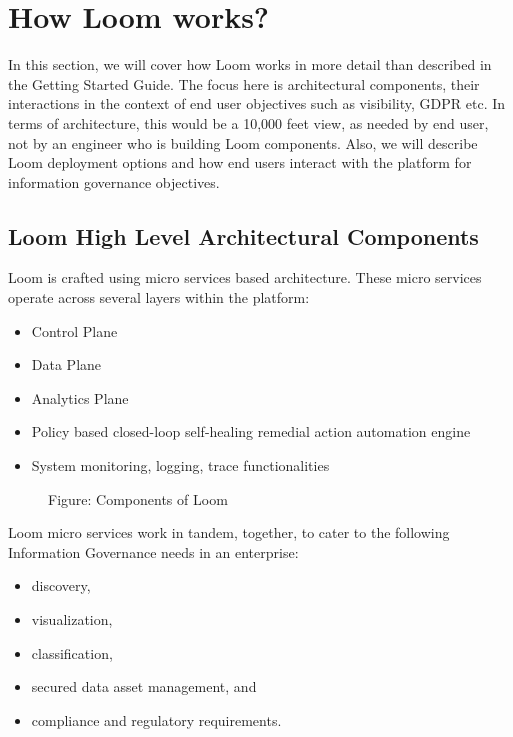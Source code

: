 \documentclass[letterpaper,10pt,english]{sphinxmanual}
\begin{document}
\chapter{How Loom works?}
\label{\detokenize{mcdmp_concepts:how-loom-works}}
In this section, we will cover how Loom works in more detail than described in the Getting Started Guide.  The focus here is architectural components, their interactions in the context of end user objectives such as visibility, GDPR etc. In terms of architecture, this would be a 10,000 feet view, as needed by end user, not by an engineer who is building Loom components. Also, we will describe Loom deployment options and how end users interact with the platform for information governance objectives.


\section{Loom High Level Architectural Components}
\label{\detokenize{mcdmp_concepts:loom-high-level-architectural-components}}
Loom is crafted using micro services based architecture.  These micro services operate across several layers within the platform:
\begin{itemize}
\item {} 
Control Plane

\item {} 
Data Plane

\item {} 
Analytics Plane

\item {} 
Policy based closed-loop self-healing remedial action automation engine

\item {} 
System monitoring, logging, trace functionalities

\end{itemize}

\begin{figure}[htbp]
\centering
\capstart

\noindent{}
\caption{Figure: Components of Loom}\label{\detokenize{mcdmp_concepts:id4}}\end{figure}

Loom micro services work in tandem, together, to cater to the following Information Governance needs in an enterprise:
\begin{itemize}
\item {} 
discovery,

\item {} 
visualization,

\item {} 
classification,

\item {} 
secured data asset management, and

\item {} 
compliance and regulatory requirements.

\end{itemize}
\end{document}
